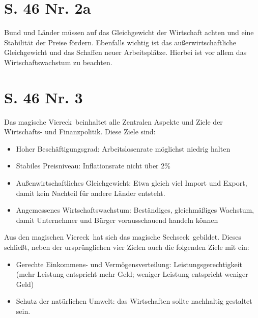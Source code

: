 \documentclass[a4paper, 12pt]{report}
\begin{document}
	\bsremovechaptertitle
	\chapter{S. 46 Nr. 2a}
	Bund und Länder müssen auf das Gleichgewicht der Wirtschaft achten und eine Stabilität der Preise fördern.
	Ebenfalls wichtig ist das außerwirtschaftliche Gleichgewicht und das Schaffen neuer Arbeitsplätze.
	Hierbei ist vor allem das Wirtschaftswachstum zu beachten.
	\chapter{S. 46 Nr. 3}
	Das \dq magische Viereck\dq\ beinhaltet alle Zentralen Aspekte und Ziele der Wirtschafts- und Finanzpolitik.
	Diese Ziele sind:
	\begin{itemize}
		\item Hoher Beschäftigungsgrad: Arbeitslosenrate möglichst niedrig halten
		\item Stabiles Preisniveau: Inflationsrate nicht über 2\%
		\item Außenwirtschaftliches Gleichgewicht: Etwa gleich viel Import und Export, damit kein Nachteil für andere Länder entsteht.
		\item Angemessenes Wirtschaftswachstum: Beständiges, gleichmäßiges Wachstum, damit Unternehmer und Bürger vorausschauend handeln können
	\end{itemize}
	Aus den \dq magischen Viereck\dq\ hat sich das \dq magische Sechseck\dq\ gebildet.
	Dieses schließt, neben der ursprünglichen vier Zielen auch die folgenden Ziele mit ein:
	\begin{itemize}
		\item Gerechte Einkommens- und Vermögensverteilung: Leistungsgerechtigkeit (mehr Leistung entspricht mehr Geld; weniger Leistung entspricht weniger Geld)
		\item Schutz der natürlichen Umwelt: das Wirtschaften sollte nachhaltig gestaltet sein.
	\end{itemize}
\end{document}
